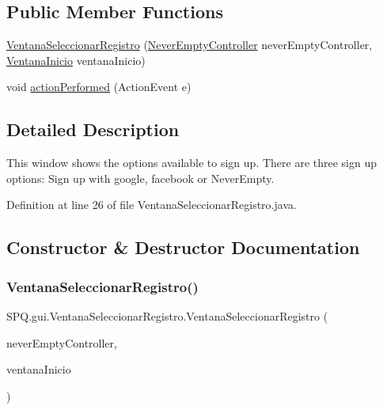 \subsection*{Public Member Functions}
\begin{DoxyCompactItemize}
\item 
\mbox{\hyperlink{class_s_p_q_1_1gui_1_1_ventana_seleccionar_registro_ada3229c157db0999beb117311151fed1}{Ventana\+Seleccionar\+Registro}} (\mbox{\hyperlink{class_s_p_q_1_1controller_1_1_never_empty_controller}{Never\+Empty\+Controller}} never\+Empty\+Controller, \mbox{\hyperlink{class_s_p_q_1_1gui_1_1_ventana_inicio}{Ventana\+Inicio}} ventana\+Inicio)
\item 
void \mbox{\hyperlink{class_s_p_q_1_1gui_1_1_ventana_seleccionar_registro_aba6b384895ceebb731575e5fa0141ae3}{action\+Performed}} (Action\+Event e)
\end{DoxyCompactItemize}


\subsection{Detailed Description}
This window shows the options available to sign up. There are three sign up options\+: Sign up with google, facebook or Never\+Empty. 

Definition at line 26 of file Ventana\+Seleccionar\+Registro.\+java.



\subsection{Constructor \& Destructor Documentation}
\mbox{\label{class_s_p_q_1_1gui_1_1_ventana_seleccionar_registro_ada3229c157db0999beb117311151fed1}} 
\subsubsection{\texorpdfstring{Ventana\+Seleccionar\+Registro()}{VentanaSeleccionarRegistro()}}
{\footnotesize\ttfamily S\+P\+Q.\+gui.\+Ventana\+Seleccionar\+Registro.\+Ventana\+Seleccionar\+Registro (\begin{DoxyParamCaption}\item[{\mbox{\hyperlink{class_s_p_q_1_1controller_1_1_never_empty_controller}{Never\+Empty\+Controller}}}]{never\+Empty\+Controller,  }\item[{\mbox{\hyperlink{class_s_p_q_1_1gui_1_1_ventana_inicio}{Ventana\+Inicio}}}]{ventana\+Inicio }\end{DoxyParamCaption})}



